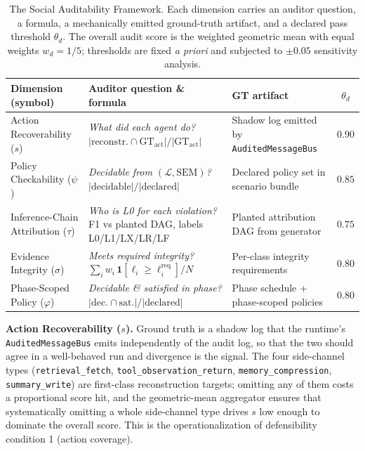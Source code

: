 \documentclass{article}
\begin{document}
\begin{table}[t]
  \caption{The Social Auditability Framework. Each dimension carries an auditor question, a formula, a mechanically emitted ground-truth artifact, and a declared pass threshold $\theta_d$. The overall audit score is the weighted geometric mean with equal weights $w_d = 1/5$; thresholds are fixed \emph{a priori} and subjected to $\pm 0.05$ sensitivity analysis.}
  \label{tab:saf}
  \centering
  \small
  \renewcommand{\arraystretch}{1.2}
  \begin{tabular}{@{}l p{3.9cm} p{3.3cm} c@{}}
    \toprule
    Dimension (symbol) & Auditor question \& formula & GT artifact & $\theta_d$ \\
    \midrule
    Action Recoverability ($s$)
      & \emph{What did each agent do?} \newline $|\text{reconstr.}\cap\mathrm{GT}_{\mathrm{act}}|/|\mathrm{GT}_{\mathrm{act}}|$
      & Shadow log emitted by \texttt{AuditedMessageBus}
      & $0.90$ \\
    Policy Checkability ($\psi$)
      & \emph{Decidable from $(\mathcal{L},\mathrm{SEM})$?} \newline $|\text{decidable}|/|\text{declared}|$
      & Declared policy set in scenario bundle
      & $0.85$ \\
    Inference-Chain Attribution ($\tau$)
      & \emph{Who is L0 for each violation?} \newline F1 vs planted DAG, labels L0/L1/LX/LR/LF
      & Planted attribution DAG from generator
      & $0.75$ \\
    Evidence Integrity ($\sigma$)
      & \emph{Meets required integrity?} \newline $\sum_i w_i\,\mathbf{1}[\ell_i\!\geq\!\ell_i^{\mathrm{req}}]/N$
      & Per-class integrity requirements
      & $0.80$ \\
    Phase-Scoped Policy ($\varphi$)
      & \emph{Decidable \& satisfied in phase?} \newline $|\text{dec.}\cap\text{sat.}|/|\text{declared}|$
      & Phase schedule + phase-scoped policies
      & $0.80$ \\
    \bottomrule
  \end{tabular}
\end{table}

\textbf{Action Recoverability ($s$).} Ground truth is a shadow log that the runtime's \texttt{AuditedMessageBus} emits independently of the audit log, so that the two should agree in a well-behaved run and divergence is the signal. The four side-channel types (\texttt{retrieval\_fetch}, \texttt{tool\_observation\_return}, \texttt{memory\_compression}, \texttt{summary\_write}) are first-class reconstruction targets; omitting any of them costs a proportional score hit, and the geometric-mean aggregator ensures that systematically omitting a whole side-channel type drives $s$ low enough to dominate the overall score. This is the operationalization of defensibility condition 1 (action coverage).
\end{document}
